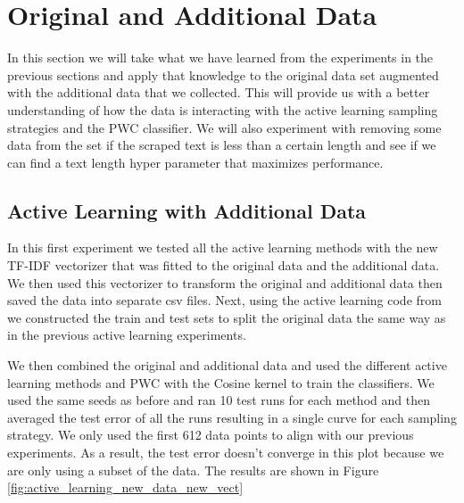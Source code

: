 \section{Original and Additional Data}

In this section we will take what we have learned from the experiments in the previous sections and apply that knowledge to the original data set augmented with the additional data that we collected. This will provide us with a better understanding of how the data is interacting with the active learning sampling strategies and the PWC classifier. We will also experiment with removing some data from the set if the scraped text is less than a certain length and see if we can find a text length hyper parameter that maximizes performance.

\subsection{Active Learning with Additional Data}

In this first experiment we tested all the active learning methods with the new TF-IDF vectorizer that was fitted to the original data and the additional data. We then used this vectorizer to transform the original and additional data then saved the data into separate csv files. Next, using the active learning code from \cite{kottke2021toward} we constructed the train and test sets to split the original data the same way as in the previous active learning experiments.  

We then combined the original and additional data and used the different active learning methods and PWC with the Cosine kernel to train the classifiers. We used the same seeds as before and ran 10 test runs for each method and then averaged the test error of all the runs resulting in a single curve for each sampling strategy. We only used the first 612 data points to align with our previous experiments. As a result, the test error doesn't converge in this plot because we are only using a subset of the data. The results are shown in Figure \ref{fig:active_learning_new_data_new_vect}

